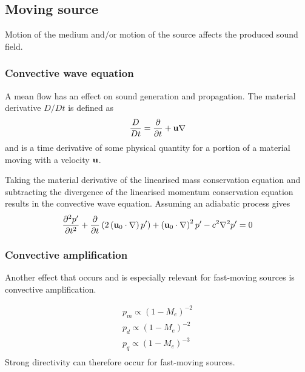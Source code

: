 \subsection{Moving source}
Motion of the medium and/or motion of the source affects the produced sound field.

\subsubsection*{Convective wave equation}
A mean flow has an effect on sound generation and propagation.
The material derivative $D/Dt$ is defined as
\begin{equation}
  \frac{D}{Dt} = \frac{\partial}{\partial t} + \mathbf{u} \nabla
\end{equation}
and is a time derivative of some physical quantity for a portion of a material
moving with a velocity $\mathbf{u}$.

Taking the material derivative of the linearised mass conservation equation and
subtracting the divergence of the linearised momentum conservation equation
results in the convective wave equation.
Assuming an adiabatic process gives
\begin{equation}
  \frac{\partial^2 p'}{\partial t^2} + \frac{\partial}{\partial t} \left( 2 \left( \mathbf{u}_0 \cdot \nabla \right) p' \right) + \left( \mathbf{u}_0 \cdot \nabla \right)^2 p' - c^2 \nabla^2 p' = 0
\end{equation}


\subsubsection*{Convective amplification}
Another effect that occurs and is especially relevant for fast-moving sources is
convective amplification.

\begin{align}
 p_{m} \propto \left( 1 - M_e \right)^{-2} \\
 p_{d} \propto \left( 1 - M_e \right)^{-2} \\
 p_{q} \propto \left( 1 - M_e \right)^{-3} \\
\end{align}
Strong directivity can therefore occur for fast-moving sources.


\cite{Dowling1976}


